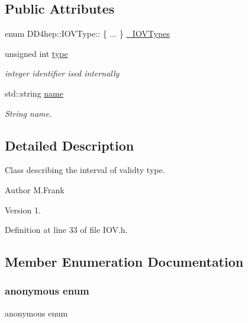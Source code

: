 \subsection*{Public Attributes}
\begin{DoxyCompactItemize}
\item 
enum D\+D4hep\+::\+I\+O\+V\+Type\+:: \{ ... \}  \hyperlink{class_d_d4hep_1_1_i_o_v_type_a065ca1030c72dec59bd0c6533acaa1da}{\+\_\+\+I\+O\+V\+Types}
\item 
unsigned int \hyperlink{class_d_d4hep_1_1_i_o_v_type_a8387532d69591a4379b8f84fa2302c5a}{type}
\begin{DoxyCompactList}\small\item\em integer identifier ised internally \end{DoxyCompactList}\item 
std\+::string \hyperlink{class_d_d4hep_1_1_i_o_v_type_ac4fa3d6c589f183137625501e757234e}{name}
\begin{DoxyCompactList}\small\item\em String name. \end{DoxyCompactList}\end{DoxyCompactItemize}


\subsection{Detailed Description}
Class describing the interval of validty type. 

\begin{DoxyAuthor}{Author}
M.\+Frank 
\end{DoxyAuthor}
\begin{DoxyVersion}{Version}
1. 
\end{DoxyVersion}


Definition at line 33 of file I\+O\+V.\+h.



\subsection{Member Enumeration Documentation}
\hypertarget{class_d_d4hep_1_1_i_o_v_type_acef1483c5ce503d44367cf75875c5797}{}\label{class_d_d4hep_1_1_i_o_v_type_acef1483c5ce503d44367cf75875c5797} 
\subsubsection{\texorpdfstring{anonymous enum}{anonymous enum}}
{\footnotesize\ttfamily anonymous enum}

